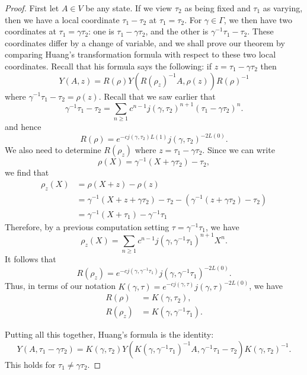 \documentclass[10pt,a4paper]{amsart}
\begin{document}
\begin{proof}
    First let $A\in V$ be any state. If we view $\tau_2$ as being fixed and $\tau_1$ as varying, then we have a local coordinate $\tau_1-\tau_2$ at $\tau_1=\tau_2$. For $\gamma \in \Gamma$, we then have two coordinates at $\tau_1 = \gamma \tau_2$: one is $\tau_1 - \gamma \tau_2$, and the other is $\gamma^{-1}\tau_1 - \tau_2$.  These coordinates differ by a change of variable, and we shall prove our theorem by comparing Huang's transformation formula with respect to these two local coordinates. Recall that his formula says the following: if $z = \tau_1-\gamma \tau_2$ then 
    \[
     Y(A,z) = R(\rho)Y(R(\rho_z)^{-1}A,\rho(z))R(\rho)^{-1}
    \]
    where $\gamma^{-1}\tau_1-\tau_2 = \rho(z)$. Recall that we saw earlier that
    \[
    \gamma^{-1}\tau_1-\tau_2 = \sum_{n\geq 1} c^{n-1}j(\gamma,\tau_2)^{n+1}(\tau_1-\gamma\tau_2)^n.
    \]
   and hence
    \[
    R(\rho) = e^{-cj(\gamma,\tau_2)L(1)}j(\gamma,\tau_2)^{-2L(0)}.
    \]
    We also need to determine $R(\rho_z)$ where $z = \tau_1-\gamma\tau_2$. Since we can write 
    \[\rho(X) = \gamma^{-1}(X+\gamma \tau_2)-\tau_2,\] 
    we find that
    \begin{align*}
        \rho_z(X) &=\rho(X+z)-\rho(z)\\
        &= \gamma^{-1}(X+z+\gamma \tau_2)-\tau_2 - (\gamma^{-1}(z+\gamma\tau_2) - \tau_2)\\
        &=\gamma^{-1}(X+\tau_1) - \gamma^{-1}\tau_1
    \end{align*}
    Therefore, by a previous computation setting $\tau = \gamma^{-1}\tau_1$, we have
    \[
        \rho_z(X) = \sum_{n\geq 1} c^{n-1}j(\gamma, \gamma^{-1}\tau_1)^{n+1}X^n.
    \]
    It follows that
    \[
      R(\rho_z) = e^{-cj(\gamma,\gamma^{-1}\tau_1)}j(\gamma,\gamma^{-1}\tau_1)^{-2L(0)}.
    \]
    Thus, in terms of our notation $K(\gamma,\tau) = e^{-cj(\gamma,\tau)}j(\gamma,\tau)^{-2L(0)}$, we have
    \begin{align*}
    R(\rho) &= K(\gamma, \tau_2),\\
    R(\rho_z) &= K(\gamma,\gamma^{-1}\tau_1).
    \end{align*}
    
    Putting all this together, Huang's formula is the identity:
    \begin{equation}
        \label{eq:huang1}
        Y(A,\tau_1-\gamma \tau_2) = K(\gamma, \tau_2)Y(K(\gamma,\gamma^{-1}\tau_1)^{-1}A,\gamma^{-1}\tau_1-\tau_2) K(\gamma,\tau_2)^{-1}.
    \end{equation}
    This holds for $\tau_1\neq \gamma \tau_2$.


\end{proof}
\end{document}
